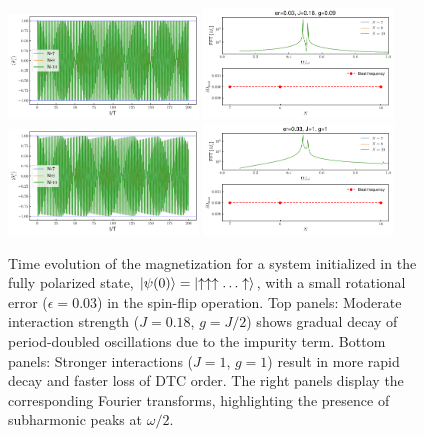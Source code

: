 \documentclass[a4paper, 10pt]{article}
\begin{document}
\begin{figure}[h!]
    \centering
    \includegraphics[width=0.45\textwidth]{figs/DTC_mag_inset_er=0.03_J=0.18_g=0.09.pdf}
    \includegraphics[width=0.45\textwidth]{figs/DTC_mag_fft_inset_er=0.03_J=0.18_g=0.09.pdf}\\
    \includegraphics[width=0.45\textwidth]{figs/DTC_mag_inset_er=0.03_J=1_g=1.pdf}
    \includegraphics[width=0.45\textwidth]{figs/DTC_mag_fft_inset_er=0.03_J=1_g=1.pdf}
    \caption{Time evolution of the magnetization for a system initialized in the fully polarized state, $\ket{\psi(0)} = \ket{\uparrow \uparrow \uparrow \ldots \uparrow}$, with a small rotational error ($\epsilon = 0.03$) in the spin-flip operation. Top panels: Moderate interaction strength ($J=0.18$, $g=J/2$) shows gradual decay of period-doubled oscillations due to the impurity term. Bottom panels: Stronger interactions ($J=1$, $g=1$) result in more rapid decay and faster loss of DTC order. The right panels display the corresponding Fourier transforms, highlighting the presence of subharmonic peaks at $\omega/2$.}
    \label{figs:clean_flatband_dtc_er}
\end{figure}
\end{document}
